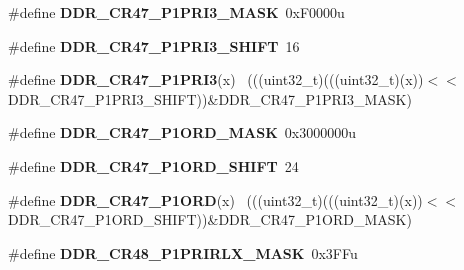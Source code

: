 \begin{DoxyCompactItemize}
\item 
\hypertarget{group___d_d_r___register___masks_gae3d955066ac5d7956d6c084093f692eb}{}\#define {\bfseries D\+D\+R\+\_\+\+C\+R47\+\_\+\+P1\+P\+R\+I3\+\_\+\+M\+A\+S\+K}~0x\+F0000u\label{group___d_d_r___register___masks_gae3d955066ac5d7956d6c084093f692eb}

\item 
\hypertarget{group___d_d_r___register___masks_gadca1f5366ac9d3b01bcfabeec049fa46}{}\#define {\bfseries D\+D\+R\+\_\+\+C\+R47\+\_\+\+P1\+P\+R\+I3\+\_\+\+S\+H\+I\+F\+T}~16\label{group___d_d_r___register___masks_gadca1f5366ac9d3b01bcfabeec049fa46}

\item 
\hypertarget{group___d_d_r___register___masks_ga9f33bdb597b09ba0a958e68af21c73d0}{}\#define {\bfseries D\+D\+R\+\_\+\+C\+R47\+\_\+\+P1\+P\+R\+I3}(x)                                          ~(((uint32\+\_\+t)(((uint32\+\_\+t)(x))$<$$<$D\+D\+R\+\_\+\+C\+R47\+\_\+\+P1\+P\+R\+I3\+\_\+\+S\+H\+I\+F\+T))\&D\+D\+R\+\_\+\+C\+R47\+\_\+\+P1\+P\+R\+I3\+\_\+\+M\+A\+S\+K)\label{group___d_d_r___register___masks_ga9f33bdb597b09ba0a958e68af21c73d0}

\item 
\hypertarget{group___d_d_r___register___masks_gaa452b6192cba0e8e39d2bc39c580dfd9}{}\#define {\bfseries D\+D\+R\+\_\+\+C\+R47\+\_\+\+P1\+O\+R\+D\+\_\+\+M\+A\+S\+K}~0x3000000u\label{group___d_d_r___register___masks_gaa452b6192cba0e8e39d2bc39c580dfd9}

\item 
\hypertarget{group___d_d_r___register___masks_ga3175fac5d15922314ac381e2b849f5fb}{}\#define {\bfseries D\+D\+R\+\_\+\+C\+R47\+\_\+\+P1\+O\+R\+D\+\_\+\+S\+H\+I\+F\+T}~24\label{group___d_d_r___register___masks_ga3175fac5d15922314ac381e2b849f5fb}

\item 
\hypertarget{group___d_d_r___register___masks_gafacd1965be9089f342e1eedb3dfb4608}{}\#define {\bfseries D\+D\+R\+\_\+\+C\+R47\+\_\+\+P1\+O\+R\+D}(x)                                            ~(((uint32\+\_\+t)(((uint32\+\_\+t)(x))$<$$<$D\+D\+R\+\_\+\+C\+R47\+\_\+\+P1\+O\+R\+D\+\_\+\+S\+H\+I\+F\+T))\&D\+D\+R\+\_\+\+C\+R47\+\_\+\+P1\+O\+R\+D\+\_\+\+M\+A\+S\+K)\label{group___d_d_r___register___masks_gafacd1965be9089f342e1eedb3dfb4608}

\item 
\hypertarget{group___d_d_r___register___masks_gaaf746a9719e11b5bf80bbb6ec6475134}{}\#define {\bfseries D\+D\+R\+\_\+\+C\+R48\+\_\+\+P1\+P\+R\+I\+R\+L\+X\+\_\+\+M\+A\+S\+K}~0x3\+F\+Fu\label{group___d_d_r___register___masks_gaaf746a9719e11b5bf80bbb6ec6475134}


\end{DoxyCompactItemize}
